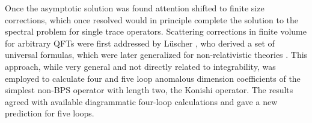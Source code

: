 \vspace{20pt}
\vspace{20pt}

Once the asymptotic solution was found attention shifted to finite size corrections, which once resolved would in principle complete the solution to the spectral problem for single trace operators. 
Scattering corrections in finite volume for arbitrary QFTs were first addressed by L\"{u}scher \cite{Luscher:1986}, who derived a set of universal formulas, which were later generalized for non-relativistic theories \cite{Janik:2007wt}.
This approach, while very general and not directly related to integrability, was employed to calculate four \cite{Bajnok:2008bm} and five loop anomalous dimension coefficients \cite{Bajnok:2009vm} of the simplest non-BPS operator with length two, the Konishi operator.
The results agreed with available diagrammatic four-loop calculations \cite{Fiamberti:2007rj} and gave a new prediction for five loops.

